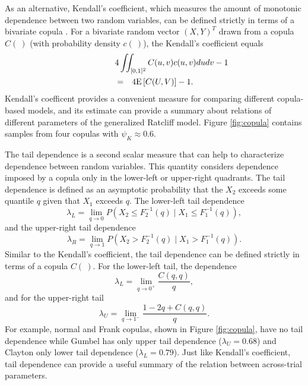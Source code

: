 \documentclass[12pt]{article}
\begin{document}
As an alternative, Kendall's  coefficient, which
measures the amount of monotonic dependence between two random variables,
can be defined strictly in terms of a bivariate copula \citep{Joe1997,Nel2007}.  For a bivariate random vector $(X, Y)^T$ drawn from a copula $C(\:)$ (with probability density $c(\:)$), the Kendall's coefficient equals
\begin{eqnarray}
\lefteqn{4 \iint_{[0,1]^2}C(u,v)c(u,v)dudv - 1} \nonumber \\ 
& = & 4 \mathrm{E}\left[C(U,V)\right] - 1.
\end{eqnarray}
Kendall's coefficent provides a convenient measure for comparing different copula-based models, and its estimate can provide a summary about relations of different parameters of the generalized Ratcliff model. Figure \ref{fig:copula} contains samples from four copulas with $\psi_K \approx 0.6$.

The tail dependence is a second scalar measure that can help to characterize dependence between random variables. This quantity considers dependence imposed by a copula only in the lower-left or upper-right quadrants. The tail dependence is defined as an asymptotic probability that the $X_2$ exceeds some quantile $q$ given that $X_1$ exceeds $q$. The  lower-left tail dependence
\begin{equation}
\lambda_L = \lim_{q \to 0}P\left(X_2 \leq F_2^{-1}(q) \mid X_1 \leq F_1^{-1}(q)\right), 
\end{equation}
and the upper-right tail dependence
\begin{equation}
\lambda_R = \lim_{q \to 1}P\left(X_2 > F_2^{-1}(q) \mid X_1 > F_1^{-1}(q)\right).
\end{equation}
Similar to the Kendall's coefficient, the tail dependence can be defined  strictly in terms of a copula $C(\:)$. For the lower-left tail, the dependence 
\begin{equation}
\lambda_L = \lim_{q \to 0^+}\frac{C(q, q)}{q},
\end{equation}
and for the upper-right tail
\begin{equation}
\lambda_U = \lim_{q \to 1^-}\frac{1 - 2q + C(q, q)}{q}.
\end{equation}
For example, normal and Frank copulas, shown in Figure \ref{fig:copula}, have no tail dependence while Gumbel has only upper tail dependence ($\lambda_U = 0.68$) and Clayton only lower tail dependence ($\lambda_L = 0.79$). 
Just like Kendall's coefficient, tail dependence can provide a useful summary of the relation between across-trial parameters.  
\end{document}
